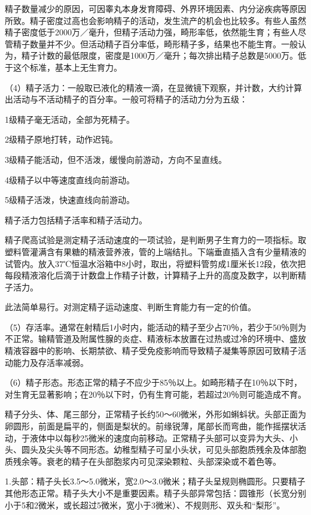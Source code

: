 \documentclass[12pt,UTF8,openany]{ctexbook}
\begin{document}
精子数量减少的原因，可因睾丸本身发育障碍、外界环境因素、内分泌疾病等原因所致。精子密度过高也会影响精子的活动，发生流产的机会也比较多。有些人虽然精子密度低于2000万／毫升，但精子活动力强，畸形率低，依然能生育；有些人尽管精子数量并不少。但活动精子百分率低，畸形精子多，结果也不能生育。一般认为，精子计数的最低限度，密度是1000万／毫升；每次排出精子总数是5000万。低于这个标准，基本上无生育力。

（4）精子活力：一般取已液化的精液一滴，在显微镜下观察，并计数，大约计算出活动与不活动精子的百分率。一般可将精子的活动力分为五级：

1级精子毫无活动，全部为死精子。

2级精子原地打转，动作迟钝。

3级精子能活动，但不活泼，缓慢向前游动，方向不呈直线。

4级精子以中等速度直线向前游动。

5级精子活泼，快速直线向前游动。

精子活力包括精子活率和精子活动力。

精子爬高试验是测定精子活动速度的一项试验，是判断男子生育力的一项指标。取塑料管灌满含有果糖的精液营养液，管的上端结扎。下端垂直插入含有少量精液的试管内。放入37℃恒温水浴箱中8小时，取出，将塑料管剪成1厘米长12段，依次把每段精液溶化后滴于计数盘上作精子计数，计算精子上升的高度及数字，以判断精子活力。

此法简单易行。对测定精子运动速度、判断生育能力有一定的价值。

（5）存活率。通常在射精后1小时内，能活动的精子至少占70％，若少于50％则为不正常。输精管道及附属性腺的炎症、精液标本放置在过热或过冷的环境中、盛放精液容器中的影响、长期禁欲、精子受免疫影响而导致精子凝集等原因可致精子活动能力及存活率减弱。

（6）精子形态。形态正常的精子不应少于85％以上。如畸形精子在10％以下时，对生育无显著影响；在20％以下时，仍有生育可能，若超过20％则可能造成不育。

精子分头、体、尾三部分，正常精子长约50～60微米，外形如蝌蚪状。头部正面为卵圆形，前面是扁平的，侧面是梨状的。前缘锐薄，尾部长而弯曲，能作摇摆状活动，于液体中以每秒25微米的速度向前移动。正常精子头部可以变异为大头、小头、圆头及尖头等不同形态。幼稚型精子可呈小头状，可见头部胞质残余及体部胞质残余等。衰老的精子在头部胞浆内可见深染颗粒、头部深染或不着色等。

1.头部：精子头长3.5～5.0微米，宽2.0～3.0微米；精子头呈规则椭圆形。只要精子其他形态正常。精子头大小不是重要因素。精子头部异常包括：圆锥形（长宽分别小于5和2微米，或长超过5微米，宽小于3微米）、不规则形、双头和“梨形”。
\end{document}
